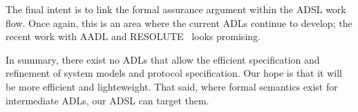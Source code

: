 The final intent is to link the formal assurance argument within the ADSL work
flow. Once again, this is an area where the current ADLs continue to develop;
the recent work with AADL and RESOLUTE~\cite{gacek2014resolute} looks
promising.

In summary, there exist no ADLs that allow the efficient
specification and refinement of system models and protocol specification. Our
hope is that it will be more efficient and lighteweight. That said, where formal
semantics exist for intermediate ADLs, our ADSL can target them.









